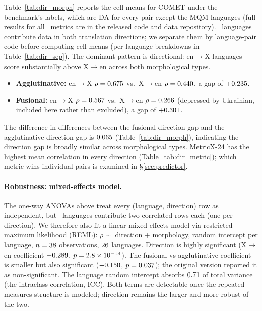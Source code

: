 \documentclass[11pt]{article}
\begin{document}
Table~\ref{tab:dir_morph} reports the cell means for COMET under the benchmark's labels, which are DA for every pair except the MQM languages (full results for all \NumMetrics\ metrics are in the released code and data repository). \NumMixedLangs\ languages contribute data in both translation directions; we separate them by language-pair code before computing cell means (per-language breakdowns in Table~\ref{tab:dir_sep}). The dominant pattern is directional: en$\to$X languages score substantially above X$\to$en across both morphological types.
\begin{itemize}
  \item \textbf{Agglutinative:} en$\to$X $\rho=0.675$ vs.\ X$\to$en $\rho=0.440$, a gap of $+0.235$.
  \item \textbf{Fusional:} en$\to$X $\rho=0.567$ vs.\ X$\to$en $\rho=0.266$ (depressed by Ukrainian, included here rather than excluded), a gap of $+0.301$.
\end{itemize}
The difference-in-differences between the fusional direction gap and the agglutinative direction gap is $0.065$ (Table~\ref{tab:dir_morph}), indicating the direction gap is broadly similar across morphological types. MetricX-24 has the highest mean correlation in every direction (Table~\ref{tab:dir_metric}); which metric wins individual pairs is examined in \S\ref{sec:predictor}.

\paragraph{Robustness: mixed-effects model.} The one-way ANOVAs above treat every (language, direction) row as independent, but \NumMixedLangs\ languages contribute two correlated rows each (one per direction). We therefore also fit a linear mixed-effects model via restricted maximum likelihood (REML): $\rho \sim$ direction + morphology, random intercept per language, $n=38$ observations, $26$ languages. Direction is highly significant (X$\to$en coefficient $-0.289$, $p=2.8\times10^{-18}$). The fusional-vs-agglutinative coefficient is smaller but also significant ($-0.150$, $p=0.037$); the original version reported it as non-significant. The language random intercept absorbs $0.71$ of total variance (the intraclass correlation, ICC). Both terms are detectable once the repeated-measures structure is modeled; direction remains the larger and more robust of the two.
\end{document}
